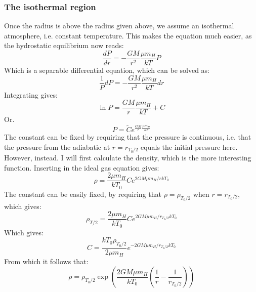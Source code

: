 \documentclass[a4paper,10pt,english]{article}
\begin{document}
\subsubsection{The isothermal region}
Once the radius is above the radius given above, we assume an isothermal atmosphere, i.e. constant temperature. This makes the equation much easier, as the hydrostatic equilibrium now reads:
$$\frac{dP}{dr}=-\frac{GM}{r^2}\frac{\mu m_H}{kT}P$$
Which is a separable differential equation, which can be solved as:
$$\frac{1}{P}dP=-\frac{GM}{r^2}\frac{\mu m_H}{kT}dr$$
Integrating gives:
$$\ln P=\frac{GM}{r}\frac{\mu m_H}{kT}+C$$
Or.
$$P=\tilde{C}e^{\frac{GM}{r}\frac{\mu m_H}{kT}}$$
The constant can be fixed by requiring that the pressure is continuous, i.e. that the pressure from the adiabatic at $r=r_{T_0/2}$ equals the initial pressure here. However, instead. I will first calculate the density, which is the more interesting function. Inserting in the ideal gas equation gives:
$$\rho=\frac{2\mu m_H}{kT_0}Ce^{2GM\mu m_H/rkT_0}$$
The constant can be easily fixed, by requiring that $\rho=\rho_{T_0/2}$ when $r=r_{T_0/2}$, which gives:
$$\rho_{T/2}=\frac{2\mu m_H}{kT_0}Ce^{2GM\mu m_H/r_{T_0/2}kT_0}$$
Which gives:
$$C=\frac{kT_0\rho_{T_0/2}}{2\mu m_H}e^{-2GM\mu m_H/r_{T_0/2}kT_0}$$
From which it follows that:
$$\rho=\rho_{T_0/2}\exp\left(\frac{2GM\mu m_H}{kT_0}\left(\frac{1}{r}-\frac{1}{r_{T_0/2}}\right)\right)$$
\end{document}
